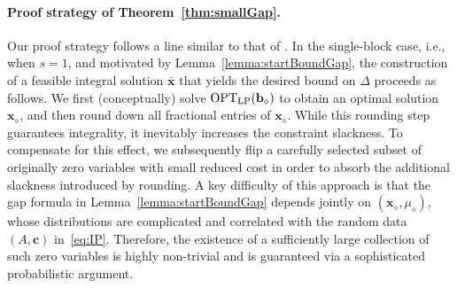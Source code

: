 \documentclass{article}
\newcommand{\cv}[0]{\mathbf{c}}
\newcommand{\xv}[0]{\mathbf{x}}
\newcommand{\bv}[0]{\mathbf{b}}
\newcommand{\OPT}{\textup{OPT}}
\begin{document}
\paragraph{Proof strategy of Theorem~\ref{thm:smallGap}.} Our proof strategy follows a line similar to that of \cite{dyer1989probabilistic}.
In the single-block case, i.e., when $s=1$, and motivated by
Lemma~\ref{lemma:startBoundGap}, the construction of a feasible integral
solution $\bar{\xv}$ that yields the desired bound on $\Delta$ proceeds as
follows.
We first (conceptually) solve $\OPT_{\mathrm{LP}}(\bv_{\diamond})$ to obtain an
optimal solution $\xv_{\diamond}$, and then round down all fractional entries
of $\xv_{\diamond}$.
While this rounding step guarantees integrality, it inevitably increases the
constraint slackness.
To compensate for this effect, we subsequently flip a carefully selected
subset of originally zero variables with small reduced cost in order to absorb
the additional slackness introduced by rounding.
A key difficulty of this approach is that the gap formula in
Lemma~\ref{lemma:startBoundGap} depends jointly on
$(\xv_{\diamond}, \mu_{\diamond})$, whose distributions are complicated and
correlated with the random data $(A,\cv)$ in~\eqref{eq:IP}.
Therefore, the existence of a sufficiently large collection of such zero
variables is highly non-trivial and is guaranteed via a sophisticated
probabilistic argument.
\end{document}
